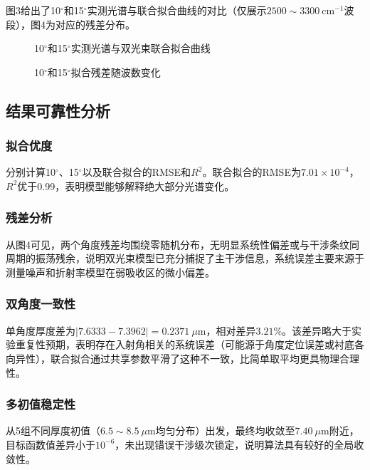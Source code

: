 \documentclass[12pt,a4paper]{ctexart}
\begin{document}
	图3给出了10$^\circ$和15$^\circ$实测光谱与联合拟合曲线的对比（仅展示$2500\sim3300\ \mathrm{cm^{-1}}$波段），图4为对应的残差分布。
	
	\begin{figure}[htbp]
		\centering
		\hfill
		\caption{10$^\circ$和15$^\circ$实测光谱与双光束联合拟合曲线}
		\label{fig:fit_curves}
	\end{figure}
	
	\begin{figure}[htbp]
		\centering
		\hfill
		\caption{10$^\circ$和15$^\circ$拟合残差随波数变化}
		\label{fig:residuals}
	\end{figure}
	
	\subsection{结果可靠性分析}
	
	\subsubsection{拟合优度}
	分别计算10$^\circ$、15$^\circ$以及联合拟合的RMSE和$R^2$。联合拟合的RMSE为$7.01\times10^{-4}$，$R^2$优于0.99，表明模型能够解释绝大部分光谱变化。
	
	\subsubsection{残差分析}
	从图4可见，两个角度残差均围绕零随机分布，无明显系统性偏差或与干涉条纹同周期的振荡残余，说明双光束模型已充分捕捉了主干涉信息，系统误差主要来源于测量噪声和折射率模型在弱吸收区的微小偏差。
	
	\subsubsection{双角度一致性}
	单角度厚度差为$|7.6333-7.3962|=0.2371\ \mu\mathrm{m}$，相对差异$3.21\%$。该差异略大于实验重复性预期，表明存在入射角相关的系统误差（可能源于角度定位误差或衬底各向异性），联合拟合通过共享参数平滑了这种不一致，比简单取平均更具物理合理性。
	
	\subsubsection{多初值稳定性}
	从5组不同厚度初值（$6.5\sim8.5\ \mu\mathrm{m}$均匀分布）出发，最终均收敛至$7.40\ \mu\mathrm{m}$附近，目标函数值差异小于$10^{-6}$，未出现错误干涉级次锁定，说明算法具有较好的全局收敛性。
	
\end{document}
